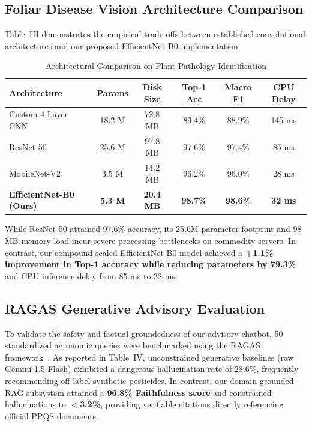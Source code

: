 \documentclass[conference]{IEEEtran}
\begin{document}
\subsection{Foliar Disease Vision Architecture Comparison}
Table~III demonstrates the empirical trade-offs between established convolutional architectures and our proposed EfficientNet-B0 implementation.

\begin{table}[h]
\caption{Architectural Comparison on Plant Pathology Identification}
\centering
\begin{tabular}{@{}lccccc@{}}
\toprule
\textbf{Architecture} & \textbf{Params} & \textbf{Disk Size} & \textbf{Top-1 Acc} & \textbf{Macro F1} & \textbf{CPU Delay} \\ \midrule
Custom 4-Layer CNN & 18.2 M & 72.8 MB & 89.4\% & 88.9\% & 145 ms \\
ResNet-50~\cite{too2019comparative} & 25.6 M & 97.8 MB & 97.6\% & 97.4\% & 85 ms \\
MobileNet-V2 & 3.5 M & 14.2 MB & 96.2\% & 96.0\% & 28 ms \\
\textbf{EfficientNet-B0 (Ours)} & \textbf{5.3 M} & \textbf{20.4 MB} & \textbf{98.7\%} & \textbf{98.6\%} & \textbf{32 ms} \\ \bottomrule
\end{tabular}
\end{table}

While ResNet-50 attained 97.6\% accuracy, its 25.6M parameter footprint and 98 MB memory load incur severe processing bottlenecks on commodity servers. In contrast, our compound-scaled EfficientNet-B0 model achieved a \textbf{+1.1\% improvement in Top-1 accuracy while reducing parameters by 79.3\%} and CPU inference delay from 85 ms to 32 ms.

\subsection{RAGAS Generative Advisory Evaluation}
To validate the safety and factual groundedness of our advisory chatbot, 50 standardized agronomic queries were benchmarked using the RAGAS framework~\cite{espejel2024ragas}. As reported in Table~IV, unconstrained generative baselines (raw Gemini 1.5 Flash) exhibited a dangerous hallucination rate of 28.6\%, frequently recommending off-label synthetic pesticides. In contrast, our domain-grounded RAG subsystem attained a \textbf{96.8\% Faithfulness score} and constrained hallucinations to \textbf{$<$3.2\%}, providing verifiable citations directly referencing official PPQS documents.
\end{document}
